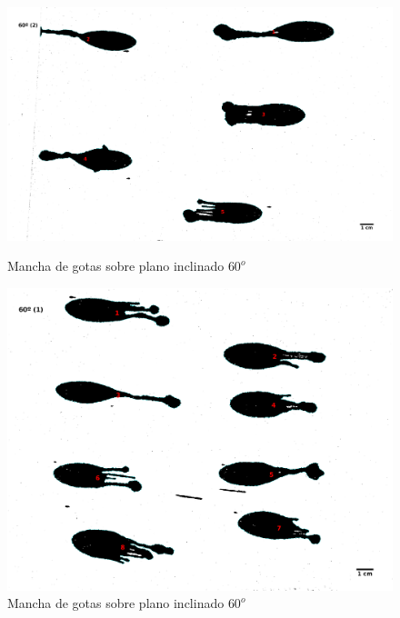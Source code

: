 \begin{figure}[H] \begin{minipage}{.5\textwidth} \centering
\includegraphics[width=1.0\linewidth]{src/60_deg-1.png} \caption{Mancha de
gotas sobre plano inclinado $60^o$} \label{fig:60deg-1} \end{minipage}%
\begin{minipage}{.5\textwidth} \centering
\includegraphics[width=1.0\linewidth]{src/60_2_deg-1.png} \caption{Mancha de
gotas sobre plano inclinado $60^o$} \label{fig:60deg-2} \end{minipage}

\end{figure}

